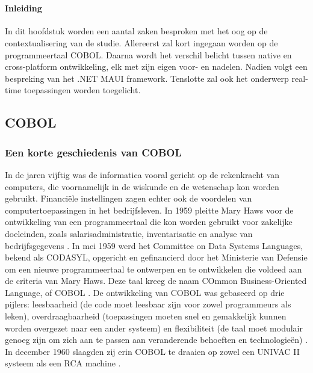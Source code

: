 \chapter{}%
\label{ch:stand-van-zaken}



\subsubsection{Inleiding}

In dit hoofdstuk worden een aantal zaken besproken met het oog op de contextualisering van de studie. Allereerst zal kort ingegaan worden op de programmeertaal COBOL. Daarna wordt het verschil belicht tussen native en cross-platform ontwikkeling, elk met zijn eigen voor- en nadelen. Nadien volgt een bespreking van het .NET MAUI framework. Tenslotte zal ook het onderwerp real-time toepassingen worden toegelicht.

\section{COBOL}
\subsection{Een korte geschiedenis van COBOL}
In de jaren vijftig was de informatica vooral gericht op de rekenkracht van computers, die voornamelijk in de wiskunde en de wetenschap kon worden gebruikt. Financiële instellingen zagen echter ook de voordelen van computertoepassingen in het bedrijfsleven. In 1959 pleitte Mary Haws voor de ontwikkeling van een programmeertaal die kon worden gebruikt voor zakelijke doeleinden, zoals salarisadministratie, inventarisatie en analyse van bedrijfsgegevens \autocite{NMAH2013}.
In mei 1959 werd het Committee on Data Systems Languages, bekend als CODASYL, opgericht en gefinancierd door het Ministerie van Defensie om een nieuwe programmeertaal te ontwerpen en te ontwikkelen die voldeed aan de criteria van Mary Haws. Deze taal kreeg de naam COmmon Business-Oriented Language, of COBOL \autocite{Abby2023}.
De ontwikkeling van COBOL was gebaseerd op drie pijlers: leesbaarheid (de code moet leesbaar zijn voor zowel programmeurs als leken), overdraagbaarheid (toepassingen moeten snel en gemakkelijk kunnen worden overgezet naar een ander systeem) en flexibiliteit (de taal moet modulair genoeg zijn om zich aan te passen aan veranderende behoeften en technologieën) \autocite{Abby2023}.
In december 1960 slaagden zij erin COBOL te draaien op zowel een UNIVAC II systeem als een RCA machine \autocite{NMAH2013}.

